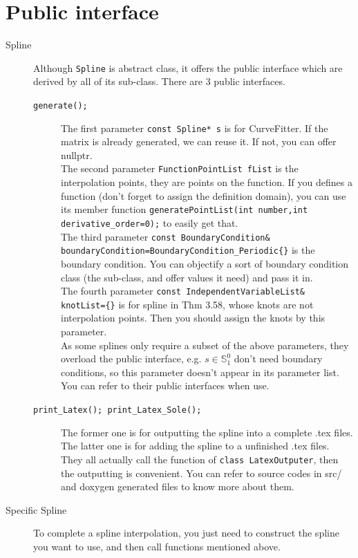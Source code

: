 \documentclass[a4paper]{article}
\begin{document}
\section*{Public interface}
\begin{description}
  \item[Spline] Although \texttt{Spline} is abstract class, it offers the public interface which are derived by all of its sub-class.
  There are 3 public interfaces.
  \begin{description}
    \item[\texttt{generate();}]
    The first parameter \texttt{const Spline* s} is for CurveFitter. If the matrix is already generated, we can reuse it. If not, you can offer nullptr.\\
    The second parameter \texttt{FunctionPointList fList} is the interpolation points, they are points on the function. If you defines a function (don't forget to assign the definition domain), you can use its member function 
    \texttt{generatePointList(int number,int derivative\_order=0);} to easily get that.\\
    The third parameter \texttt{const BoundaryCondition\& boundaryCondition=BoundaryCondition\_Periodic\{\}} is the boundary condition. You can objectify a sort of boundary condition class (the sub-class, and offer values it need) and pass it in.\\
    The fourth parameter \texttt{const IndependentVariableList\& knotList=\{\}} is for spline in Thm 3.58, whose knots are not interpolation points. Then you should assign the knots by this parameter.\\
    As some splines only require a subset of the above parameters, they overload the public interface, e.g. $s \in \mathbb{S}_1^0$ don't need boundary conditions, so this parameter doesn't appear in its parameter list. You can refer to their public interfaces when use.
    \item[\texttt{print\_Latex(); print\_Latex\_Sole();}]
    The former one is for outputting the spline into a complete .tex files. The latter one is for adding the spline to a unfinished .tex files.
    They all actually call the function of \texttt{class LatexOutputer}, then the outputting is convenient. You can refer to source codes in src/ and doxygen generated files to know more about them.
  \end{description}
  \item[Specific Spline] To complete a spline interpolation, you just need to construct the spline you want to use, and then call functions mentioned above.
\end{description}

\printbibliography
\end{document}
